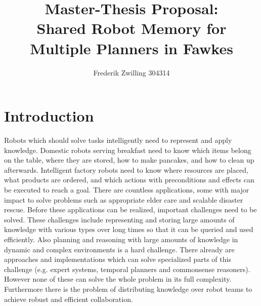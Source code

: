 \documentclass[a4paper,11pt]{article}
\author{Frederik Zwilling 304314}
\title{Master-Thesis Proposal:\\ Shared Robot Memory for Multiple Planners in Fawkes}
\begin{document}
\maketitle


\section{Introduction}
\label{sec:introduction}
Robots which should solve tasks intelligently need to represent and
apply knowledge. Domestic robots serving breakfast need to know which
items belong on the table, where they are stored, how to make
pancakes, and how to clean up afterwards. Intelligent factory robots
need to know where resources are placed, what products are ordered,
and which actions with preconditions and effects can be executed to
reach a goal. There are countless applications, some with major impact
to solve problems such as appropriate elder care and scalable disaster
rescue. Before these applications can be realized, important
challenges need to be solved. These challenges include representing
and storing large amounts of knowledge with various types over long
times so that it can be queried and used efficiently. Also planning
and reasoning with large amounts of knowledge in dynamic and complex
environments is a hard challenge. There already are approaches and
implementations which can solve specialized parts of this challenge
(e.g. expert systems, temporal planners and commonsense
reasoners). However none of these can solve the whole problem in its
full complexity. Furthermore there is the problem of distributing
knowledge over robot teams to achieve robust and efficient
collaboration.
\end{document}
